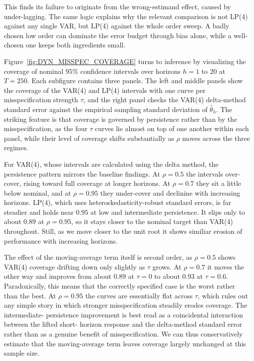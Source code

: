 This finds its failure to originate from the wrong-estimand effect, caused by under-lagging. The 
same logic explains why the relevant comparison is not LP(4) against any single VAR, but LP(4) 
against the whole order sweep. A badly chosen low order can dominate the error budget 
through bias alone, while a well-chosen one keeps both ingredients small.



Figure~\ref{fig:DYN_MISSPEC_COVERAGE} turns to inference by visualizing the coverage of 
nominal $95\%$ confidence intervals over horizons $h = 1$ to $20$ at $T = 250$. Each subfigure 
contains three panels. The left and middle panels show the coverage of the VAR(4) and LP(4) 
intervals with one curve per misspecification strength $\tau$, and the right panel checks the 
VAR(4) delta-method standard error against the empirical sampling standard deviation of 
$\hat\theta_h$. The striking feature is that coverage is governed by persistence rather than by 
the misspecification, as the four $\tau$ curves lie almost on top of one another within each panel, 
while their level of coverage shifts substantially as $\rho$ moves across the three regimes.

For VAR(4), whose intervals are calculated using the delta method, the persistence pattern mirrors the 
baseline findings. At $\rho = 0.5$ the intervals over-cover, rising toward full coverage at longer 
horizons. At $\rho = 0.7$ they sit a little below 
nominal, and at $\rho = 0.95$ they under-cover and declinine with increasing horizons.
LP(4), which uses heteroskedasticity-robust standard errors, is far steadier and holds near $0.95$ at low and intermediate persistence.
It slips only to about $0.89$ at $\rho = 0.95$, so it stays closer to the nominal target than VAR(4) throughout.
Still, as we move closer to the unit root it shows similiar erosion of performance with increasing horizons.

The effect of the moving-average term itself is second order, as $\rho = 0.5$ shows VAR(4) coverage 
drifting down only slightly as $\tau$ grows. At $\rho = 0.7$ it moves the other way and improves from about $0.89$ at $\tau = 0$ to 
about $0.93$ at $\tau = 0.6$. Paradoxically, this means that the correctly specified case is the worst rather than the 
best. At $\rho = 0.95$ the curves are essentially flat across $\tau$, which rules out any 
simple story in which stronger misspecification steadily erodes coverage. The intermediate-
persistence improvement is best read as a coincidental interaction between the lifted short-
horizon response and the delta-method standard error rather than as a genuine benefit of 
misspecification. We can thus conservatively estimate that the moving-average term leaves coverage largely 
unchanged at this sample size.

